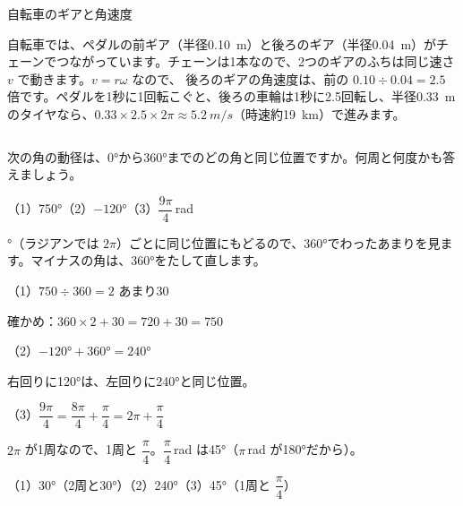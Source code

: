 \begin{column}{自転車のギアと角速度}
\noindent\begin{minipage}[c]{0.62\linewidth}
\raggedright
自転車では、ペダルの前ギア（半径\qty{0.10}{m}）と後ろのギア（半径\qty{0.04}{m}）がチェーンでつながっています。チェーンは1本なので、2つのギアのふちは同じ速さ $v$ で動きます。$v=r\omega$ なので、
後ろのギアの角速度は、前の $0.10\div0.04=2.5$ 倍です。ペダルを1秒に1回転こぐと、後ろの車輪は1秒に2.5回転し、半径\qty{0.33}{m}のタイヤなら、$0.33\times2.5\times2\pi\approx\qty{5.2}{m/s}$（時速約\qty{19}{km}）で進みます。
\end{minipage}\hfill
\begin{minipage}[c]{0.34\linewidth}
\centering
{}
\end{minipage}
\end{column}


\begin{reidai}
次の角の動径は、0°から360°までのどの角と同じ位置ですか。何周と何度かも答えましょう。\par
（1）750°\quad（2）$-120°$\quad（3）$\dfrac{9\pi}{4}$\,rad\par
{}°（ラジアンでは $2\pi$）ごとに同じ位置にもどるので、360°でわったあまりを見ます。マイナスの角は、360°をたして直します。\par
\shiki{}\zw{} （1）$750\div360=2$ あまり30\par
\bkivib 確かめ：$360\times2+30=720+30=750$\par
\bkiviq （2）$-120°+360°=240°$\par
\bkivib 右回りに120°は、左回りに240°と同じ位置。\par
\bkiviq （3）$\dfrac{9\pi}{4}=\dfrac{8\pi}{4}+\dfrac{\pi}{4}=2\pi+\dfrac{\pi}{4}$\par
\bkivib $2\pi$ が1周なので、1周と $\dfrac{\pi}{4}$。$\dfrac{\pi}{4}$\,rad は45°（$\pi$\,rad が180°だから）。\par
\kotae{}\zw{} （1）30°（2周と30°）\quad（2）240°\quad（3）45°（1周と $\dfrac{\pi}{4}$）
\end{reidai}

